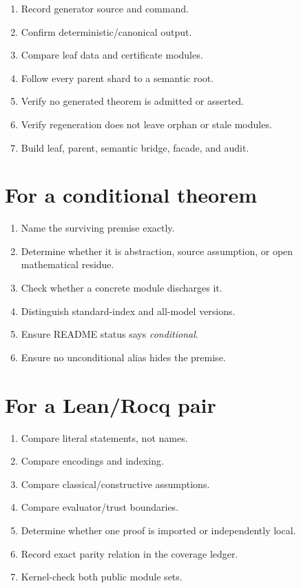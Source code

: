 \documentclass[
  10pt,
  a4paper,
  twoside,
  open=any,
  parskip=half,
  headings=big
]{scrreprt}
\begin{document}
\begin{enumerate}
  \item Record generator source and command.
  \item Confirm deterministic/canonical output.
  \item Compare leaf data and certificate modules.
  \item Follow every parent shard to a semantic root.
  \item Verify no generated theorem is admitted or asserted.
  \item Verify regeneration does not leave orphan or stale modules.
  \item Build leaf, parent, semantic bridge, facade, and audit.
\end{enumerate}

\section{For a conditional theorem}

\begin{enumerate}
  \item Name the surviving premise exactly.
  \item Determine whether it is abstraction, source assumption, or open
        mathematical residue.
  \item Check whether a concrete module discharges it.
  \item Distinguish standard-index and all-model versions.
  \item Ensure README status says \emph{conditional}.
  \item Ensure no unconditional alias hides the premise.
\end{enumerate}

\section{For a Lean/Rocq pair}

\begin{enumerate}
  \item Compare literal statements, not names.
  \item Compare encodings and indexing.
  \item Compare classical/constructive assumptions.
  \item Compare evaluator/trust boundaries.
  \item Determine whether one proof is imported or independently local.
  \item Record exact parity relation in the coverage ledger.
  \item Kernel-check both public module sets.
\end{enumerate}
\end{document}
